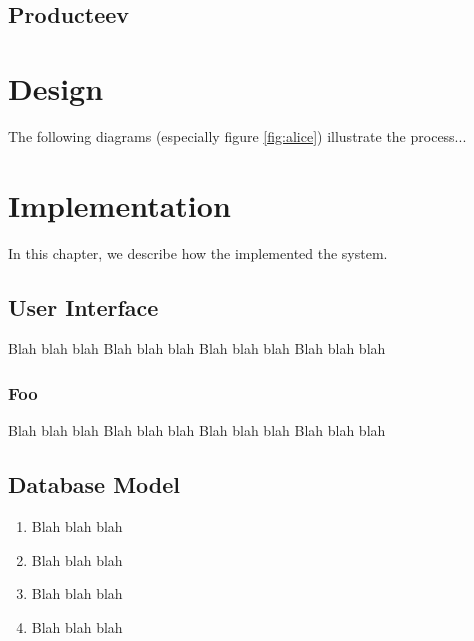 \documentclass{l3proj}
\begin{document}
\section{Producteev}
\label{producteev}

\chapter{Design}
\label{design}

The following diagrams (especially figure \ref{fig:alice}) illustrate the
process...

\chapter{Implementation}
\label{impl}

In this chapter, we describe how the implemented the system.

\section{User Interface}

Blah blah blah
Blah blah blah
Blah blah blah
Blah blah blah

\subsection{Foo}

Blah blah blah
Blah blah blah
Blah blah blah
Blah blah blah

\section{Database Model}

\begin{enumerate}
\item Blah blah blah
\item Blah blah blah
\item Blah blah blah
\item Blah blah blah
\end{enumerate}
\end{document}
